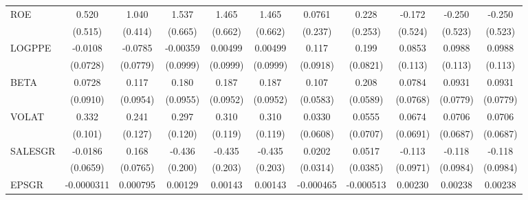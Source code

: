 \begin{table}[htbp]
\begin{tabular}{l*{10}{c}}
ROE             &    0.520         &    1.040\sym{**} &    1.537\sym{**} &    1.465\sym{**} &    1.465\sym{**} &   0.0761         &    0.228         &   -0.172         &   -0.250         &   -0.250         \\
                &  (0.515)         &  (0.414)         &  (0.665)         &  (0.662)         &  (0.662)         &  (0.237)         &  (0.253)         &  (0.524)         &  (0.523)         &  (0.523)         \\
LOGPPE          &  -0.0108         &  -0.0785         & -0.00359         &  0.00499         &  0.00499         &    0.117         &    0.199\sym{**} &   0.0853         &   0.0988         &   0.0988         \\
                & (0.0728)         & (0.0779)         & (0.0999)         & (0.0999)         & (0.0999)         & (0.0918)         & (0.0821)         &  (0.113)         &  (0.113)         &  (0.113)         \\
BETA            &   0.0728         &    0.117         &    0.180\sym{*}  &    0.187\sym{*}  &    0.187\sym{*}  &    0.107\sym{*}  &    0.208\sym{***}&   0.0784         &   0.0931         &   0.0931         \\
                & (0.0910)         & (0.0954)         & (0.0955)         & (0.0952)         & (0.0952)         & (0.0583)         & (0.0589)         & (0.0768)         & (0.0779)         & (0.0779)         \\
VOLAT           &    0.332\sym{***}&    0.241\sym{*}  &    0.297\sym{**} &    0.310\sym{**} &    0.310\sym{**} &   0.0330         &   0.0555         &   0.0674         &   0.0706         &   0.0706         \\
                &  (0.101)         &  (0.127)         &  (0.120)         &  (0.119)         &  (0.119)         & (0.0608)         & (0.0707)         & (0.0691)         & (0.0687)         & (0.0687)         \\
SALESGR         &  -0.0186         &    0.168\sym{**} &   -0.436\sym{**} &   -0.435\sym{**} &   -0.435\sym{**} &   0.0202         &   0.0517         &   -0.113         &   -0.118         &   -0.118         \\
                & (0.0659)         & (0.0765)         &  (0.200)         &  (0.203)         &  (0.203)         & (0.0314)         & (0.0385)         & (0.0971)         & (0.0984)         & (0.0984)         \\
EPSGR           &-0.0000311         & 0.000795         &  0.00129         &  0.00143         &  0.00143         &-0.000465         &-0.000513         &  0.00230\sym{**} &  0.00238\sym{**} &  0.00238\sym{**} \\

\end{tabular}
\end{table}
